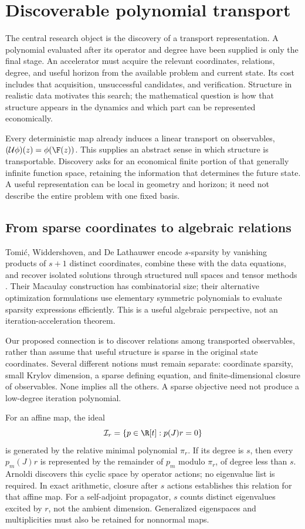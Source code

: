 \section{Discoverable polynomial transport}\label{sec:discovery}
The central research object is the discovery of a transport representation.
A polynomial evaluated after its operator and degree have been supplied is
only the final stage. An accelerator must acquire the relevant coordinates,
relations, degree, and useful horizon from the available problem and current
state. Its cost includes that acquisition, unsuccessful candidates, and
verification. Structure in realistic data motivates this search; the
mathematical question is how that structure appears in the dynamics and
which part can be represented economically.

Every deterministic map already induces a linear transport on observables,
$(\mathcal U\phi)(z)=\phi(\F(z))$. This supplies an abstract sense in which
structure is transportable. Discovery asks for an economical finite portion
of that generally infinite function space, retaining the information that
determines the future state. A useful representation can be local in geometry
and horizon; it need not describe the entire problem with one fixed basis.

\subsection{From sparse coordinates to algebraic relations}
Tomi\'c, Widdershoven, and De Lathauwer encode $s$-sparsity by vanishing
products of $s+1$ distinct coordinates, combine these with the data equations,
and recover isolated solutions through structured null spaces and tensor
methods \cite{tomic}. Their Macaulay construction has combinatorial size;
their alternative optimization formulations use elementary symmetric
polynomials to evaluate sparsity expressions efficiently. This is a useful
algebraic perspective, not an iteration-acceleration theorem.

Our proposed connection is to discover relations among transported
observables, rather than assume that useful structure is sparse in the
original state coordinates. Several different notions must remain separate:
coordinate sparsity, small Krylov dimension, a sparse defining equation,
and finite-dimensional closure of observables. None implies all the others.
A sparse objective need not produce a low-degree iteration polynomial.

For an affine map, the ideal
\[
 \mathcal I_r=\{p\in\R[t]:p(J)r=0\}
\]
is generated by the relative minimal polynomial $\pi_r$. If its degree is
$s$, then every $p_m(J)r$ is represented by the remainder of $p_m$ modulo
$\pi_r$, of degree less than $s$. Arnoldi discovers this cyclic space by
operator actions; no eigenvalue list is required. In exact arithmetic,
closure after $s$ actions establishes this relation for that affine map.
For a self-adjoint propagator, $s$ counts distinct eigenvalues excited by
$r$, not the ambient dimension. Generalized eigenspaces and multiplicities
must also be retained for nonnormal maps.

